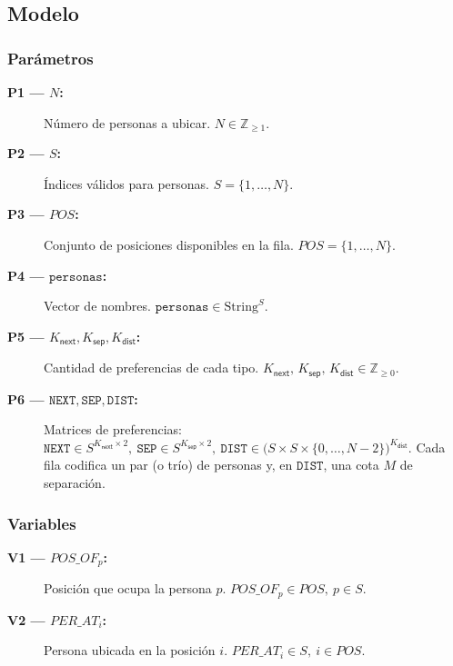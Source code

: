 \subsection{Modelo}\label{sec:05-reunion-modelo}
\subsubsection*{Parámetros}
\begin{description}
  \item[\textbf{P1 — \(N\):}] Número de personas a ubicar. \(N\in\mathbb{Z}_{\ge 1}.\)
  \item[\textbf{P2 — \(S\):}] Índices válidos para personas. \(S=\{1,\dots,N\}.\)
  \item[\textbf{P3 — \(POS\):}] Conjunto de posiciones disponibles en la fila. \(POS=\{1,\dots,N\}.\)
  \item[\textbf{P4 — \(\texttt{personas}\):}] Vector de nombres. \(\texttt{personas}\in \text{String}^{S}.\)
  \item[\textbf{P5 — \(K_{\textsf{next}}, K_{\textsf{sep}}, K_{\textsf{dist}}\):}] Cantidad de preferencias de cada tipo. \(K_{\textsf{next}},\,K_{\textsf{sep}},\,K_{\textsf{dist}}\in\mathbb{Z}_{\ge 0}.\)
  \item[\textbf{P6 — \(\texttt{NEXT},\texttt{SEP},\texttt{DIST}\):}] Matrices de preferencias: \(\texttt{NEXT}\in S^{K_{\textsf{next}}\times 2},\ \texttt{SEP}\in S^{K_{\textsf{sep}}\times 2},\ \texttt{DIST}\in \big(S\times S\times \{0,\dots,N-2\}\big)^{K_{\textsf{dist}}}.\) Cada fila codifica un par (o trío) de personas y, en \(\texttt{DIST}\), una cota \(M\) de separación.
\end{description}
\subsubsection*{Variables}
\begin{description}
  \item[\textbf{V1 — \(POS\_OF_p\):}] Posición que ocupa la persona \(p\). \(POS\_OF_p\in POS,\ p\in S.\)
  \item[\textbf{V2 — \(PER\_AT_i\):}] Persona ubicada en la posición \(i\). \(PER\_AT_i\in S,\ i\in POS.\)
\end{description}
